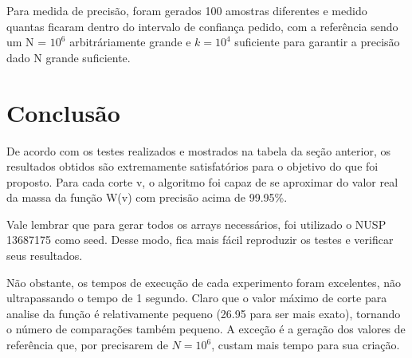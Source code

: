 \documentclass{article}
\begin{document}
	Para medida de precisão, foram gerados 100 amostras diferentes e medido quantas ficaram dentro do intervalo de confiança pedido, com a referência sendo um N = $10^6$ arbitráriamente grande e $k = 10^4$ suficiente para garantir a precisão dado N grande suficiente. 
	
	\section{Conclusão}

        De acordo com os testes realizados e mostrados na tabela da seção anterior,
        os resultados obtidos são extremamente satisfatórios para o objetivo do que foi
        proposto. Para cada corte v, o algoritmo foi capaz de se aproximar do valor
        real da massa da função W(v) com precisão acima de 99.95\%.
        
        Vale lembrar que para gerar todos os arrays necessários, foi utilizado o NUSP
        13687175 como seed. Desse modo, fica mais fácil reproduzir os testes e verificar
        seus resultados.
        
        Não obstante, os tempos de execução de cada experimento foram excelentes,
        não ultrapassando o tempo de 1 segundo. Claro que o valor máximo de corte
        para analise da função é relativamente pequeno (26.95 para ser mais exato),
        tornando o número de comparações também pequeno.
        A exceção é a geração dos valores de referência que, por precisarem de $N = 10^6$, custam mais tempo para sua criação.
\end{document}
